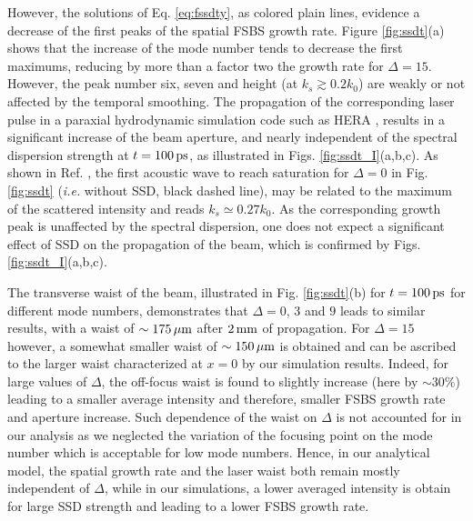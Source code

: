 \documentclass[
 reprint,
 amsmath,amssymb,
 aps,
]{revtex4-1}
\begin{document}
However, the solutions of Eq. \eqref{eq:fssdty}, as colored plain lines, evidence a decrease of the first peaks of the  spatial FSBS growth rate. Figure \ref{fig:ssdt}(a) shows that the increase of the mode number tends to decrease the first maximums, reducing by more than a factor two the growth rate  for $\Delta= 15$.
However, the peak number six, seven and height (at $k_s\gtrsim0.2k_0$) are   weakly or not affected by the temporal smoothing. 
The propagation of the corresponding laser pulse in a paraxial hydrodynamic simulation code such as HERA \cite[]{Loiseau_2006},
results in a significant increase of the beam aperture, and  nearly independent of the spectral dispersion strength at $t=100\,\rm ps$, as illustrated in Figs. \ref{fig:ssdt_I}(a,b,c).
As shown in Ref. \cite[]{POP_Ruyer_2021}, the first acoustic wave to reach saturation for $\Delta=0$ in  Fig. \ref{fig:ssdt} (\emph{i.e.} without SSD, black dashed line), may be related to the maximum of the scattered intensity and reads $k_s\simeq 0.27 k_0$. As the corresponding growth peak is unaffected by the spectral dispersion, one does not expect a significant effect of SSD on the propagation of the beam, which is  confirmed by Figs. \ref{fig:ssdt_I}(a,b,c). 


The transverse waist of the beam, illustrated in Fig. \ref{fig:ssdt}(b) for $t=100\, \rm ps$ for different mode numbers, demonstrates that $\Delta=0$, $3$ and $9$ leads to similar results, with a waist of $\sim 175\,\rm\mu m$ after $2\,\rm mm$ of propagation. For $\Delta=15$ however, a somewhat smaller waist of $\sim 150\,\rm\mu m$ is obtained and can be ascribed to the larger waist characterized at $x=0$ by our simulation results. 
Indeed, for large values of  $\Delta$, the off-focus waist is found to slightly increase (here by $\sim 30\%$) leading to a smaller average intensity and therefore, smaller FSBS growth rate and aperture increase. 
{
Such dependence  of the waist on $\Delta$ is not accounted  for in our analysis as we 
neglected the variation of the focusing point on the mode number which is acceptable for low mode numbers. Hence, in our analytical model, the spatial growth rate and the laser waist both remain mostly independent of $\Delta$, while in our simulations, a lower averaged intensity is obtain for large SSD strength and   leading to a lower FSBS growth rate.
}
\end{document}

